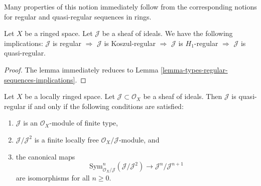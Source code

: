 \noindent
Many properties of this notion immediately follow from the
corresponding notions for regular and quasi-regular sequences
in rings.

\begin{lemma}
\label{lemma-regular-quasi-regular-scheme}
Let $X$ be a ringed space. Let $\mathcal{J}$ be a sheaf of ideals.
We have the following implications:
$\mathcal{J}$ is regular $\Rightarrow$
$\mathcal{J}$ is Koszul-regular $\Rightarrow$
$\mathcal{J}$ is $H_1$-regular $\Rightarrow$
$\mathcal{J}$ is quasi-regular.
\end{lemma}

\begin{proof}
The lemma immediately reduces to
Lemma \ref{lemma-types-regular-sequences-implications}.
\end{proof}

\begin{lemma}
\label{lemma-quasi-regular-ideal}
Let $X$ be a locally ringed space. Let $\mathcal{J} \subset \mathcal{O}_X$
be a sheaf of ideals. Then $\mathcal{J}$ is quasi-regular if and
only if the following conditions are satisfied:
\begin{enumerate}
\item $\mathcal{J}$ is an $\mathcal{O}_X$-module of finite type,
\item $\mathcal{J}/\mathcal{J}^2$ is a finite locally free
$\mathcal{O}_X/\mathcal{J}$-module, and
\item the canonical maps
$$
\text{Sym}^n_{\mathcal{O}_X/\mathcal{J}}(\mathcal{J}/\mathcal{J}^2)
\longrightarrow
\mathcal{J}^n/\mathcal{J}^{n + 1}
$$
are isomorphisms for all $n \geq 0$.
\end{enumerate}
\end{lemma}

